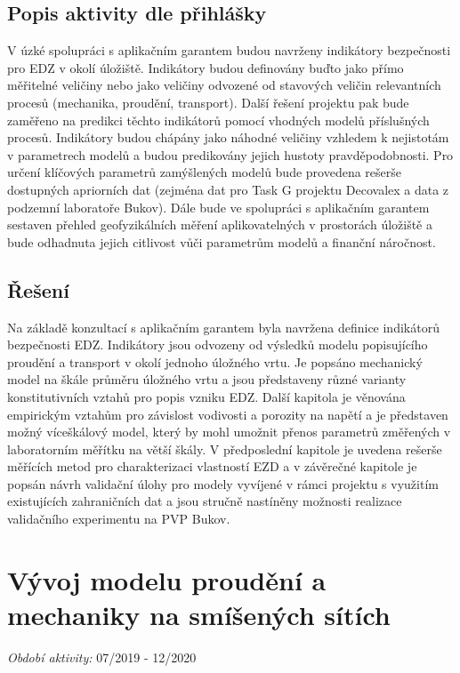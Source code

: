 \documentclass[11pt,a4paper]{article}
\begin{document}
\begin{onehalfspacing}
\subsection{Popis aktivity dle přihlášky}
V úzké spolupráci s aplikačním garantem budou navrženy indikátory bezpečnosti pro EDZ v okolí úložiště. Indikátory budou
definovány buďto jako přímo měřitelné veličiny nebo jako veličiny odvozené od stavových veličin relevantních procesů (mechanika,
proudění, transport). Další řešení projektu pak bude zaměřeno na predikci těchto indikátorů pomocí vhodných modelů příslušných
procesů. Indikátory budou chápány jako náhodné veličiny
vzhledem k nejistotám v parametrech modelů a budou predikovány jejich hustoty pravděpodobnosti. Pro určení klíčových parametrů
zamýšlených modelů bude provedena rešerše dostupných apriorních dat (zejména dat pro Task G projektu Decovalex a data z
podzemní laboratoře Bukov). Dále bude ve spolupráci s aplikačním garantem sestaven přehled geofyzikálních měření aplikovatelných
v prostorách úložiště a bude odhadnuta jejich citlivost vůči parametrům modelů a finanční náročnost.


\subsection{Řešení}
Na základě konzultací s aplikačním garantem byla navržena definice indikátorů bezpečnosti EDZ. Indikátory jsou 
odvozeny od výsledků modelu popisujícího proudění a transport v okolí jednoho úložného vrtu. Je popsáno mechanický model 
 na škále průměru úložného vrtu a jsou představeny různé varianty konstitutivních vztahů pro popis vzniku EDZ. 
 Další kapitola je věnována empirickým vztahům pro závislost vodivosti a porozity na napětí a je představen možný
 víceškálový model, který by mohl umožnit přenos parametrů změřených v laboratorním měřítku na větší škály.
 V předposlední kapitole je uvedena rešerše měřících metod pro charakterizaci vlastností EZD a v závěrečné kapitole je 
 popsán návrh validační úlohy pro modely vyvíjené v rámci projektu s využitím existujících zahraničních dat
 a jsou stručně nastíněny možnosti realizace validačního experimentu na PVP Bukov. 


\section{Vývoj modelu proudění a mechaniky na smíšených sítích}
{\it Období aktivity:}  07/2019 - 12/2020



\end{onehalfspacing}
\end{document}
